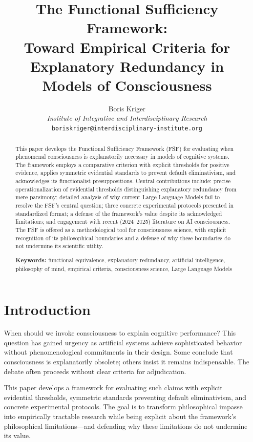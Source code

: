 \documentclass[12pt,a4paper]{article}
\title{\textbf{The Functional Sufficiency Framework:}\\[0.5em]
\large Toward Empirical Criteria for Explanatory Redundancy in Models of Consciousness}
\author{Boris Kriger\\[0.5em]
\textit{Institute of Integrative and Interdisciplinary Research}\\
\texttt{boriskriger@interdisciplinary-institute.org}}
\date{}
\begin{document}
\maketitle

\begin{abstract}
This paper develops the Functional Sufficiency Framework (FSF) for evaluating when phenomenal consciousness is explanatorily necessary in models of cognitive systems. The framework employs a comparative criterion with explicit thresholds for positive evidence, applies symmetric evidential standards to prevent default eliminativism, and acknowledges its functionalist presuppositions. Central contributions include: precise operationalization of evidential thresholds distinguishing explanatory redundancy from mere parsimony; detailed analysis of why current Large Language Models fail to resolve the FSF's central question; three concrete experimental protocols presented in standardized format; a defense of the framework's value despite its acknowledged limitations; and engagement with recent (2024--2025) literature on AI consciousness. The FSF is offered as a methodological tool for consciousness science, with explicit recognition of its philosophical boundaries and a defense of why these boundaries do not undermine its scientific utility.

\textbf{Keywords:} functional equivalence, explanatory redundancy, artificial intelligence, philosophy of mind, empirical criteria, consciousness science, Large Language Models
\end{abstract}

\section{Introduction}

When should we invoke consciousness to explain cognitive performance? This question has gained urgency as artificial systems achieve sophisticated behavior without phenomenological commitments in their design. Some conclude that consciousness is explanatorily obsolete; others insist it remains indispensable. The debate often proceeds without clear criteria for adjudication.

This paper develops a framework for evaluating such claims with explicit evidential thresholds, symmetric standards preventing default eliminativism, and concrete experimental protocols. The goal is to transform philosophical impasse into empirically tractable research while being explicit about the framework's philosophical limitations---and defending why these limitations do not undermine its value.
\end{document}
